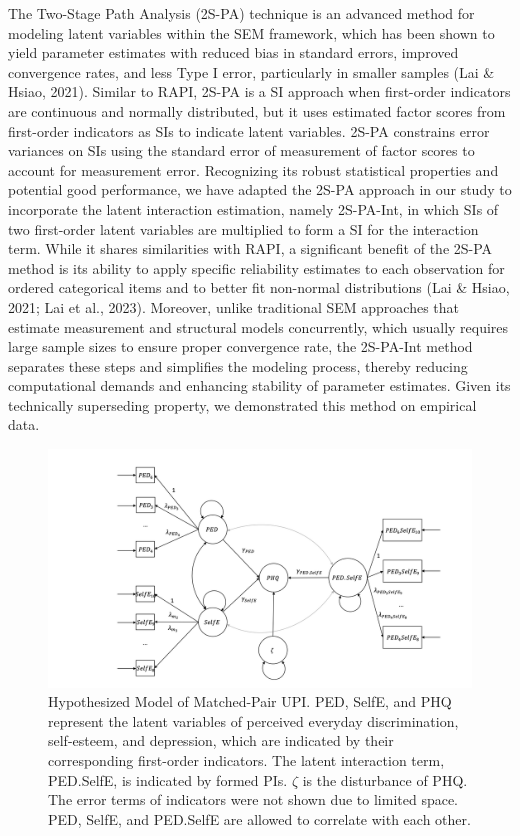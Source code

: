 \documentclass[
  man]{apa7}
\begin{document}
The Two-Stage Path Analysis (2S-PA) technique is an advanced method for modeling latent variables within the SEM framework, which has been shown to yield parameter estimates with reduced bias in standard errors, improved convergence rates, and less Type I error, particularly in smaller samples (Lai \& Hsiao, 2021). Similar to RAPI, 2S-PA is a SI approach when first-order indicators are continuous and normally distributed, but it uses estimated factor scores from first-order indicators as SIs to indicate latent variables. 2S-PA constrains error variances on SIs using the standard error of measurement of factor scores to account for measurement error. Recognizing its robust statistical properties and potential good performance, we have adapted the 2S-PA approach in our study to incorporate the latent interaction estimation, namely 2S-PA-Int, in which SIs of two first-order latent variables are multiplied to form a SI for the interaction term. While it shares similarities with RAPI, a significant benefit of the 2S-PA method is its ability to apply specific reliability estimates to each observation for ordered categorical items and to better fit non-normal distributions (Lai \& Hsiao, 2021; Lai et al., 2023). Moreover, unlike traditional SEM approaches that estimate measurement and structural models concurrently, which usually requires large sample sizes to ensure proper convergence rate, the 2S-PA-Int method separates these steps and simplifies the modeling process, thereby reducing computational demands and enhancing stability of parameter estimates. Given its technically superseding property, we demonstrated this method on empirical data.

\begin{figure}

{\centering \includegraphics[width=1\linewidth]{Plots/Slide1} 

}

\caption{Hypothesized Model of Matched-Pair UPI. PED, SelfE, and PHQ represent the latent variables of perceived everyday discrimination, self-esteem, and depression, which are indicated by their corresponding first-order indicators. The latent interaction term, PED.SelfE, is indicated by formed PIs. $\zeta$ is the disturbance of PHQ. The error terms of indicators were not shown due to limited space. PED, SelfE, and PED.SelfE are allowed to correlate with each other.}\label{fig:figure-1}
\end{figure}
\end{document}
